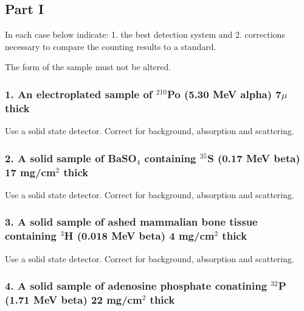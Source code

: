 \documentclass[11pt]{article}
\begin{document}
    \subsection{Part I}\label{part-i}

    In each case below indicate: 1. the best detection system and 2.
corrections necessary to compare the counting results to a standard.

The form of the sample must not be altered.

    \subsubsection{\texorpdfstring{1. An electroplated sample of
\(^{210}\)Po (5.30 MeV alpha) 7\(\mu\)
thick}{1. An electroplated sample of \^{}\{210\}Po (5.30 MeV alpha) 7\textbackslash{}mu thick}}\label{an-electroplated-sample-of-210po-5.30-mev-alpha-7mu-thick}

    Use a solid state detector. Correct for background, absorption and
scattering.

    \subsubsection{\texorpdfstring{2. A solid sample of BaSO\(_4\)
containing \(^{35}\)S (0.17 MeV beta) 17 mg/cm\(^2\)
thick}{2. A solid sample of BaSO\_4 containing \^{}\{35\}S (0.17 MeV beta) 17 mg/cm\^{}2 thick}}\label{a-solid-sample-of-baso_4-containing-35s-0.17-mev-beta-17-mgcm2-thick}

    Use a solid state detector. Correct for background, absorption and
scattering.

    \subsubsection{\texorpdfstring{3. A solid sample of ashed mammalian bone
tissue containing \(^3\)H (0.018 MeV beta) 4 mg/cm\(^2\)
thick}{3. A solid sample of ashed mammalian bone tissue containing \^{}3H (0.018 MeV beta) 4 mg/cm\^{}2 thick}}\label{a-solid-sample-of-ashed-mammalian-bone-tissue-containing-3h-0.018-mev-beta-4-mgcm2-thick}

    Use a solid state detector. Correct for background, absorption and
scattering.

    \subsubsection{\texorpdfstring{4. A solid sample of adenosine phosphate
conatining \(^{32}\)P (1.71 MeV beta) 22 mg/cm\(^2\)
thick}{4. A solid sample of adenosine phosphate conatining \^{}\{32\}P (1.71 MeV beta) 22 mg/cm\^{}2 thick}}\label{a-solid-sample-of-adenosine-phosphate-conatining-32p-1.71-mev-beta-22-mgcm2-thick}
\end{document}
